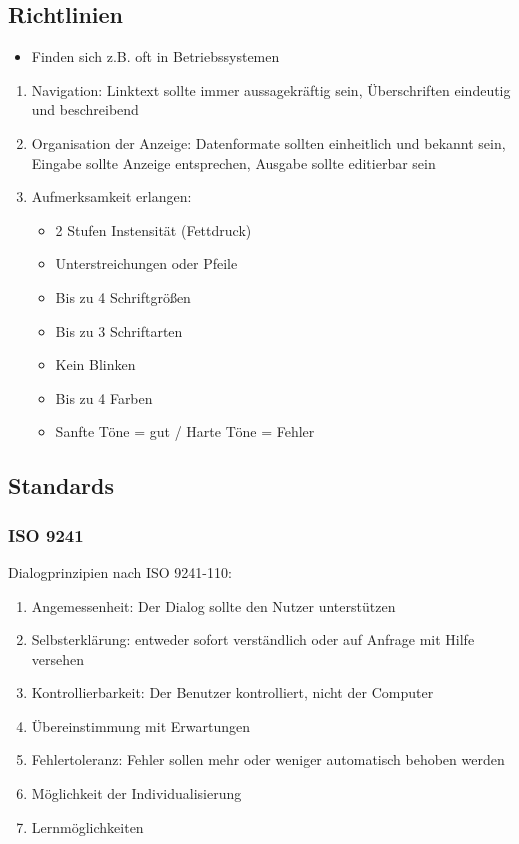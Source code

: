 \documentclass[a4paper,10pt]{article}
\begin{document}
\subsection{Richtlinien}
\begin{itemize}
	\item Finden sich z.B. oft in Betriebssystemen
\end{itemize}
\begin{enumerate}
	\item Navigation: Linktext sollte immer aussagekräftig sein, Überschriften eindeutig und beschreibend
	\item Organisation der Anzeige: Datenformate sollten einheitlich und bekannt sein, Eingabe sollte Anzeige entsprechen, Ausgabe sollte editierbar sein
	\item Aufmerksamkeit erlangen:
	\begin{itemize}
		\item 2 Stufen Instensität (Fettdruck)
		\item Unterstreichungen oder Pfeile
		\item Bis zu 4 Schriftgrößen
		\item Bis zu 3 Schriftarten
		\item Kein Blinken
		\item Bis zu 4 Farben
		\item Sanfte Töne = gut / Harte Töne = Fehler
	\end{itemize}
\end{enumerate}


\subsection{Standards}
\subsubsection{ISO 9241}
Dialogprinzipien nach ISO 9241-110:
\begin{enumerate}
	\item Angemessenheit: Der Dialog sollte den Nutzer unterstützen
	\item Selbsterklärung: entweder sofort verständlich oder auf Anfrage mit Hilfe versehen
	\item Kontrollierbarkeit: Der Benutzer kontrolliert, nicht der Computer
	\item Übereinstimmung mit Erwartungen
	\item Fehlertoleranz: Fehler sollen mehr oder weniger automatisch behoben werden
	\item Möglichkeit der Individualisierung
	\item Lernmöglichkeiten
\end{enumerate}
\end{document}

